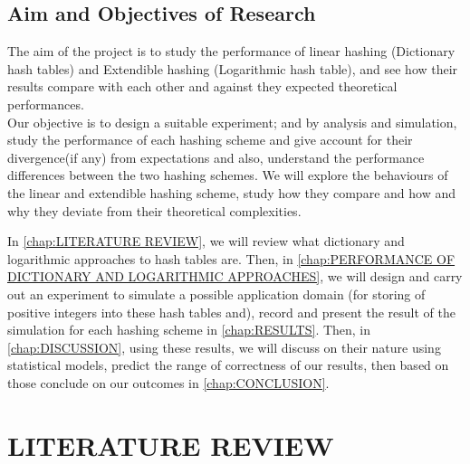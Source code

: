 \documentclass[a4paper,12pt, openany]{book}
\begin{document}
\section{ Aim and Objectives of Research}
The aim of the project is to study the performance of linear hashing (Dictionary hash tables) and Extendible hashing (Logarithmic hash table), and see how their results compare with each other and against they expected theoretical performances.  \\ Our objective is to design a suitable experiment; and by analysis and simulation,  study the performance of each hashing scheme and give account for their divergence(if any) from expectations and also, understand the performance differences between the two hashing schemes. We will explore the behaviours of the linear and extendible hashing scheme, study how they compare and how and why they deviate from their theoretical complexities.
\bigbreak

In \autoref{chap:LITERATURE REVIEW}, we will review what dictionary and logarithmic approaches to hash tables are. Then, in \autoref{chap:PERFORMANCE OF DICTIONARY AND LOGARITHMIC APPROACHES}, we will design and carry out an experiment to simulate a possible application domain (for storing of positive integers into these  hash tables and), record and present the result of the simulation for each hashing scheme in \autoref{chap:RESULTS}. Then, in \autoref{chap:DISCUSSION}, using these results, we will discuss on their nature using statistical models, predict the range of correctness of our results, then based on those conclude on our outcomes in \autoref{chap:CONCLUSION}.






\chapter{LITERATURE REVIEW} 
\label{chap:LITERATURE REVIEW}
\end{document}
